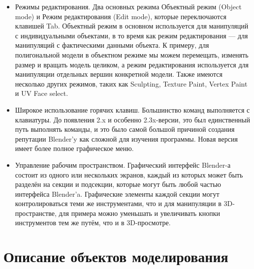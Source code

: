 \documentclass[areasetadvanced]{scrartcl}
\begin{document}
\begin{itemize}
    \item Режимы редактирования. Два основных режима Объектный режим (Object mode) и Режим
редактирования (Edit mode), которые переключаются клавишей Tab. Объектный режим в
основном используется для манипуляций с индивидуальными объектами, в то время как
режим редактирования — для манипуляций с фактическими данными объекта. К примеру,
для полигональной модели в объектном режиме мы можем перемещать, изменять размер и
вращать модель целиком, а режим редактирования используется для манипуляции
отдельных вершин конкретной модели. Также имеются несколько других режимов, таких
как Sculpting, Texture Paint, Vertex Paint и UV Face select.
\item Широкое использование горячих клавиш. Большинство команд выполняется с клавиатуры.
До появления 2.x и особенно 2.3x-версии, это был единственный путь выполнять команды,
и это было самой большой причиной создания репутации Blender’y как сложной для
изучения программы. Новая версия имеет более полное графическое меню.
\item Управление рабочим пространством. Графический интерфейс Blender-а состоит из одного
или нескольких экранов, каждый из которых может быть разделён на секции и подсекции,
которые могут быть любой частью интерфейса Blender’a. Графические элементы каждой
секции могут контролироваться теми же инструментами, что и для манипуляции в 3D-
пространстве, для примера можно уменьшать и увеличивать кнопки инструментов тем же
путём, что и в 3D-просмотре.
\end{itemize}
\newpage 
\section{Описание объектов моделирования}
\end{document}
